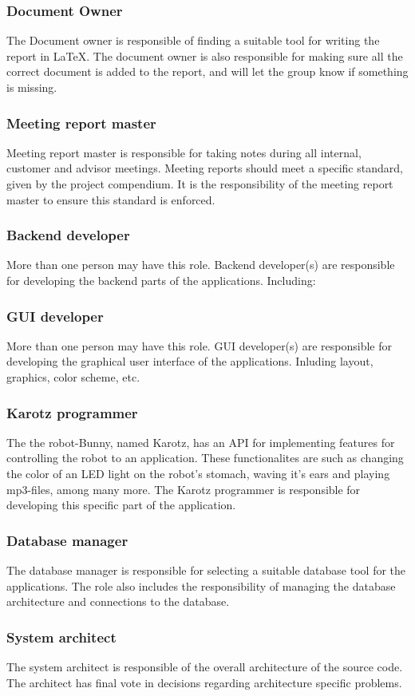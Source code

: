 \subsubsection{Document Owner}
The Document owner is responsible of finding a suitable tool for writing the report in LaTeX. The document owner is also responsible for making sure all the correct document is added to the report, and will let the group know if something is missing. 

\subsubsection{Meeting report master}
Meeting report master is responsible for taking notes during all internal, 
customer and advisor meetings. Meeting reports should meet a specific standard, 
given by the project compendium. It is the responsibility of the meeting 
report master to ensure this standard is enforced.

\subsubsection{Backend developer}
More than one person may have this role. Backend developer(s) are responsible 
for developing the backend parts of the applications. Including: 

\subsubsection{GUI developer}
More than one person may have this role. GUI developer(s) are responsible for 
developing the graphical user interface of the applications. Inluding layout, 
graphics, color scheme, etc. 

\subsubsection{Karotz programmer}
The the robot-Bunny, named Karotz, has an API for implementing features for controlling the robot to an application. These functionalites are such as changing the color of an LED light on the robot's stomach, waving it's ears and playing mp3-files, among many more.
The Karotz programmer is responsible for developing this specific part of the application. 

\subsubsection{Database manager}
The database manager is responsible for selecting a suitable database tool for 
the applications. The role also includes the responsibility of managing the 
database architecture and connections to the database.

\subsubsection{System architect}
The system architect is responsible of the overall architecture of the source code. 
The architect has final vote in decisions regarding architecture specific problems. 
